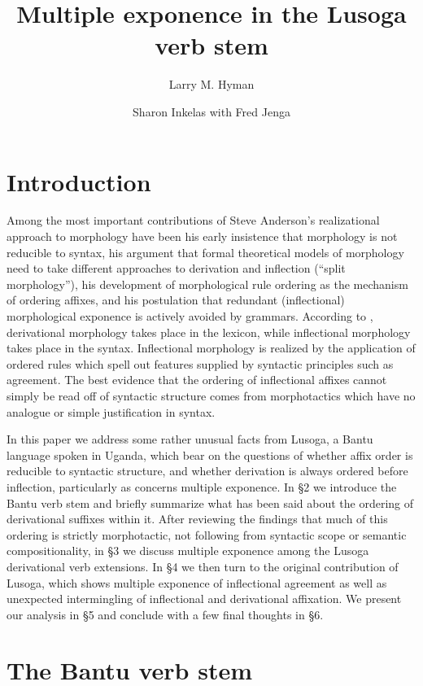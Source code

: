\documentclass[output=paper,
modfonts
]{LSP/langsci}
\title{Multiple exponence in the Lusoga verb stem}
\author{%
Larry M. Hyman\affiliation{University of California, Berkeley} \and Sharon Inkelas\affiliation{University of California, Berkeley} \lastand with Fred Jenga\affiliation{University of Texas, Austin}
}
\begin{document}
\maketitle

\section{Introduction}

Among the most important contributions of Steve Anderson's realizational
approach to morphology have been his early insistence that morphology is
not reducible to syntax, his argument that formal theoretical models of
morphology need to take different approaches to derivation and
inflection (``split morphology''), his development of morphological rule
ordering as the mechanism of ordering affixes, and his postulation that
redundant (inflectional) morphological exponence is actively avoided by
grammars. According to \citet{anderson1992}, derivational morphology takes
place in the lexicon, while inflectional morphology takes place in the
syntax. Inflectional morphology is realized by the application of
ordered rules which spell out features supplied by syntactic principles
such as agreement. The best evidence that the ordering of inflectional
affixes cannot simply be read off of syntactic structure comes from
morphotactics which have no analogue or simple justification in syntax.

In this paper we address some rather unusual facts from Lusoga, a Bantu
language spoken in Uganda, which bear on the questions of whether affix
order is reducible to syntactic structure, and whether derivation is
always ordered before inflection, particularly as concerns multiple
exponence. In §2 we introduce the Bantu verb stem and briefly summarize
what has been said about the ordering of derivational suffixes within
it. After reviewing the findings that much of this ordering is strictly
morphotactic, not following from syntactic scope or semantic
compositionality, in §3 we discuss multiple exponence among the Lusoga
derivational verb extensions. In §4 we then turn to the original
contribution of Lusoga, which shows multiple exponence of inflectional
agreement as well as unexpected intermingling of inflectional and
derivational affixation. We present our analysis in §5 and conclude with
a few final thoughts in §6.

\section{The Bantu verb stem}
\end{document}
